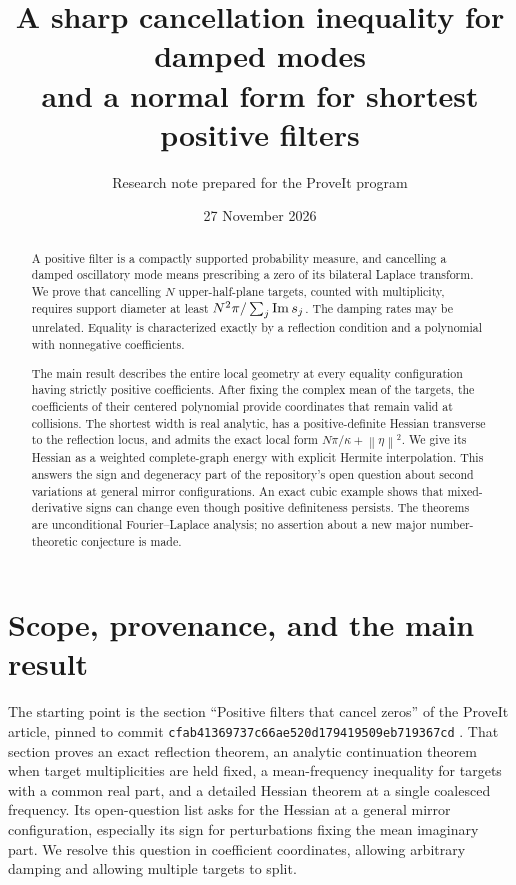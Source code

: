 \documentclass[11pt]{article}
\title{A sharp cancellation inequality for damped modes\\
and a normal form for shortest positive filters}
\author{Research note prepared for the ProveIt program}
\date{27 November 2026}
\theoremstyle{remark}\newtheorem{remark}[theorem]{Remark}
\newcommand{\norm}[1]{\left\lVert#1\right\rVert}
\begin{document}
\maketitle

\begin{abstract}
A positive filter is a compactly supported probability measure, and cancelling
a damped oscillatory mode means prescribing a zero of its bilateral Laplace
transform. We prove that cancelling $N$ upper-half-plane targets, counted with
multiplicity, requires support diameter at least $N^2\pi/\sum_j\operatorname{Im} s_j$.
The damping rates may be unrelated. Equality is characterized exactly by a
reflection condition and a polynomial with nonnegative coefficients.

The main result describes the entire local geometry at every equality
configuration having strictly positive coefficients. After fixing the complex
mean of the targets, the coefficients of their centered polynomial provide
coordinates that remain valid at collisions. The shortest width is real
analytic, has a positive-definite Hessian transverse to the reflection locus,
and admits the exact local form $N\pi/\kappa+\norm{\eta}^2$. We give its Hessian
as a weighted complete-graph energy with explicit Hermite interpolation.
This answers the sign and degeneracy part of the repository's open question
about second variations at general mirror configurations. An exact cubic
example shows that mixed-derivative signs can change even though positive
definiteness persists. The theorems are unconditional Fourier--Laplace
analysis; no assertion about a new major number-theoretic conjecture is made.
\end{abstract}

\section{Scope, provenance, and the main result}

The starting point is the section ``Positive filters that cancel zeros'' of
the ProveIt article, pinned to commit
\texttt{cfab41369737c66ae520d179419509eb719367cd} \cite{ProveIt}.
That section proves an exact reflection theorem, an analytic continuation
theorem when target multiplicities are held fixed, a mean-frequency inequality
for targets with a common real part, and a detailed Hessian theorem at a
single coalesced frequency. Its open-question list asks for the Hessian at a
general mirror configuration, especially its sign for perturbations fixing
the mean imaginary part. We resolve this question in coefficient coordinates,
allowing arbitrary damping and allowing multiple targets to split.
\end{document}
